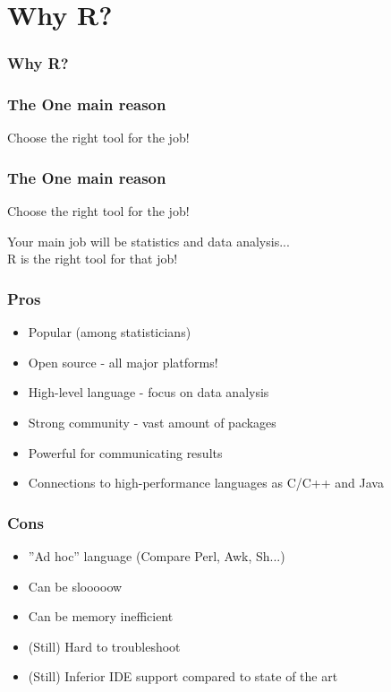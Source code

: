 \documentclass{beamer}
\begin{document}
\section{Why R?}

\begin{frame}
	\frametitle{Why R?}
\end{frame}

\begin{frame}
	\frametitle{The One main reason}
	\Huge{\centerline{Choose the right tool for the job!}}
\end{frame}

\begin{frame}
	\frametitle{The One main reason}
	\Huge{\centerline{Choose the right tool for the job!}}
	\Huge{\centerline{ }}
	\large{Your main job will be statistics and data analysis... \\
		 R is the right tool for that job!}
\end{frame}

\begin{frame}
	\frametitle{Pros}
	\begin{itemize}
		\item Popular (among statisticians)
		\item Open source - all major platforms!
		\item High-level language - focus on data analysis
		\item Strong community - vast amount of packages
		\item Powerful for communicating results
		\item Connections to high-performance languages as C/C++ and Java
	\end{itemize}
\end{frame}

\begin{frame}
	\frametitle{Cons}
	\begin{itemize}
		\item ''Ad hoc'' language (Compare Perl, Awk, Sh...)
		\item Can be slooooow
		\item Can be memory inefficient
		\item (Still) Hard to troubleshoot
		\item (Still) Inferior IDE support compared to state of the art
	\end{itemize}
\end{frame}
\end{document}
